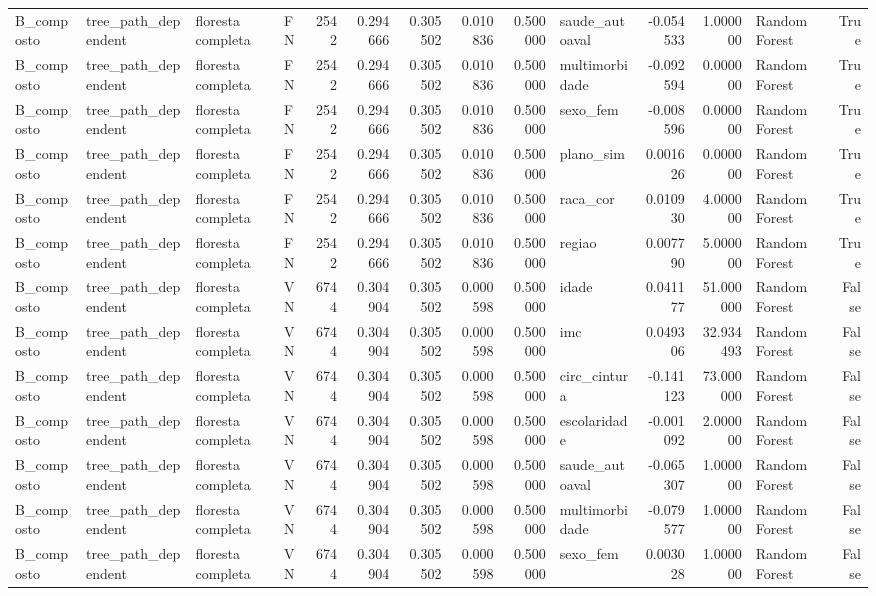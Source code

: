 \begin{tabular}{llllrrrrrlrrlr}
B_composto & tree_path_dependent & floresta completa & FN & 2542 & 0.294666 & 0.305502 & 0.010836 & 0.500000 & saude_autoaval & -0.054533 & 1.000000 & Random Forest & True \\
B_composto & tree_path_dependent & floresta completa & FN & 2542 & 0.294666 & 0.305502 & 0.010836 & 0.500000 & multimorbidade & -0.092594 & 0.000000 & Random Forest & True \\
B_composto & tree_path_dependent & floresta completa & FN & 2542 & 0.294666 & 0.305502 & 0.010836 & 0.500000 & sexo_fem & -0.008596 & 0.000000 & Random Forest & True \\
B_composto & tree_path_dependent & floresta completa & FN & 2542 & 0.294666 & 0.305502 & 0.010836 & 0.500000 & plano_sim & 0.001626 & 0.000000 & Random Forest & True \\
B_composto & tree_path_dependent & floresta completa & FN & 2542 & 0.294666 & 0.305502 & 0.010836 & 0.500000 & raca_cor & 0.010930 & 4.000000 & Random Forest & True \\
B_composto & tree_path_dependent & floresta completa & FN & 2542 & 0.294666 & 0.305502 & 0.010836 & 0.500000 & regiao & 0.007790 & 5.000000 & Random Forest & True \\
B_composto & tree_path_dependent & floresta completa & VN & 6744 & 0.304904 & 0.305502 & 0.000598 & 0.500000 & idade & 0.041177 & 51.000000 & Random Forest & False \\
B_composto & tree_path_dependent & floresta completa & VN & 6744 & 0.304904 & 0.305502 & 0.000598 & 0.500000 & imc & 0.049306 & 32.934493 & Random Forest & False \\
B_composto & tree_path_dependent & floresta completa & VN & 6744 & 0.304904 & 0.305502 & 0.000598 & 0.500000 & circ_cintura & -0.141123 & 73.000000 & Random Forest & False \\
B_composto & tree_path_dependent & floresta completa & VN & 6744 & 0.304904 & 0.305502 & 0.000598 & 0.500000 & escolaridade & -0.001092 & 2.000000 & Random Forest & False \\
B_composto & tree_path_dependent & floresta completa & VN & 6744 & 0.304904 & 0.305502 & 0.000598 & 0.500000 & saude_autoaval & -0.065307 & 1.000000 & Random Forest & False \\
B_composto & tree_path_dependent & floresta completa & VN & 6744 & 0.304904 & 0.305502 & 0.000598 & 0.500000 & multimorbidade & -0.079577 & 1.000000 & Random Forest & False \\
B_composto & tree_path_dependent & floresta completa & VN & 6744 & 0.304904 & 0.305502 & 0.000598 & 0.500000 & sexo_fem & 0.003028 & 1.000000 & Random Forest & False \\

\end{tabular}
